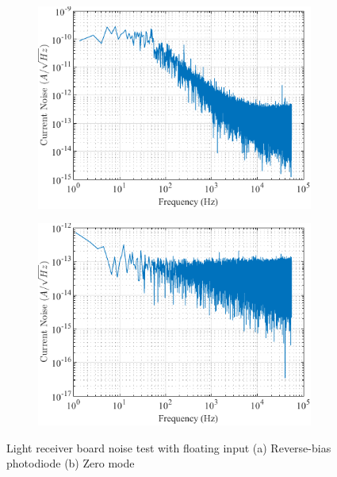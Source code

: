 \begin{figure}
\centering
\begin{subfigure}{.5\textwidth}
  \centering
  \includegraphics[width=0.9\linewidth]{4-ANC_Sys/NoiseReverseBias.pdf}
  \caption{}
  \label{fig_NoiseReverseBias}
\end{subfigure}%
\begin{subfigure}{.5\textwidth}
  \centering
  \includegraphics[width=0.9\linewidth]{4-ANC_Sys/NoiseZeroMode.pdf}
  \caption{}
  \label{fig_NoiseZeroMode}
\end{subfigure}
\caption{Light receiver board noise test with floating input (a) Reverse-bias photodiode (b) Zero mode}
\label{fig_RecBoardNoiseTest}
\end{figure}

